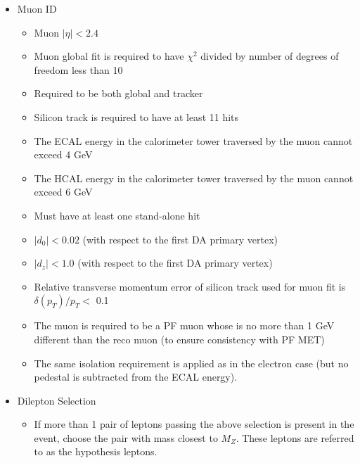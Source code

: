 \begin{itemize}
\item Muon ID
  \begin{itemize}
  \item Muon $|\eta| < 2.4$
  \item Muon global fit is required to have $\chi^2$ divided by number of degrees of freedom less than 10
  \item Required to be both global and tracker
  \item Silicon track is required to have at least 11 hits
  \item The ECAL energy in the calorimeter tower traversed by the muon cannot exceed 4 GeV
  \item The HCAL energy in the calorimeter tower traversed by the muon cannot exceed 6 GeV
  \item Must have at least one stand-alone hit
  \item $|d_0| <0.02$ (with respect to the first DA primary vertex)
  \item $|d_z| <1.0$ (with respect to the first DA primary vertex)
  \item Relative transverse momentum error of silicon track used for muon fit is  $\delta(p_{T})/p_{T} < $ 0.1
  \item The muon is required to be a PF muon whose \pt is no more than 1 GeV different than the reco muon (to ensure consistency with PF MET)
  \item The same isolation requirement is applied as in the electron case (but no pedestal is subtracted from the ECAL energy).
  \end{itemize}
\item Dilepton Selection
  \begin{itemize}
  \item If more than 1 pair of leptons passing the above selection is present in the event, choose the
    pair with mass closest to $M_{Z}$. These leptons are referred to as the \Z hypothesis leptons.
  \end{itemize}


\end{itemize}

